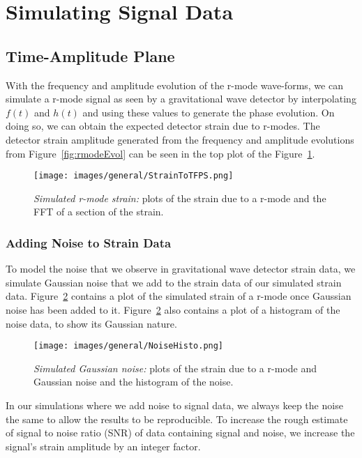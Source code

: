 \documentclass[%
reprint,
amsmath,amssymb,
aps,
]{revtex4-1}
\begin{document}
	
	
	\section{Simulating Signal Data}
	
	\subsection{Time-Amplitude Plane}
	With the frequency and amplitude evolution of the r-mode wave-forms, we can simulate a r-mode signal as seen by a gravitational wave detector by interpolating $f(t)$ and $h(t)$ and using these values to generate the phase evolution. On doing so, we can obtain the expected detector strain due to r-modes. The detector strain amplitude generated from the frequency and amplitude evolutions from Figure~\ref{fig:rmodeEvol} can be seen in the top plot of the Figure~\ref{fig:StrainAndFFT}.
	
	\begin{figure}[h]
		\centering
		\texttt{[image: images/general/StrainToTFPS.png]}
		\caption{\textit{Simulated r-mode strain:} plots of the strain due to a r-mode and the FFT of a section of the strain.}
		\label{fig:StrainAndFFT}
	\end{figure}
	
	\subsubsection{Adding Noise to Strain Data}
	To model the noise that we observe in gravitational wave detector strain data, we simulate Gaussian noise that we add to the strain data of our simulated strain data. Figure~\ref{fig:noiseStrainHist} contains a plot of the simulated strain of a r-mode once Gaussian noise has been added to it. Figure~\ref{fig:noiseStrainHist} also contains a plot of a histogram of the noise data, to show its Gaussian nature. 
	\begin{figure}[h]
		\centering
		\texttt{[image: images/general/NoiseHisto.png]}
		\caption{\textit{Simulated Gaussian noise:} plots of the strain due to a r-mode and Gaussian noise and the histogram of the noise.}
		\label{fig:noiseStrainHist}
	\end{figure}
	
	In our simulations where we add noise to signal data, we always keep the noise the same to allow the results to be reproducible. To increase the rough estimate of signal to noise ratio (SNR) of data containing signal and noise, we increase the signal's strain amplitude by an integer factor. 
	
\end{document}
